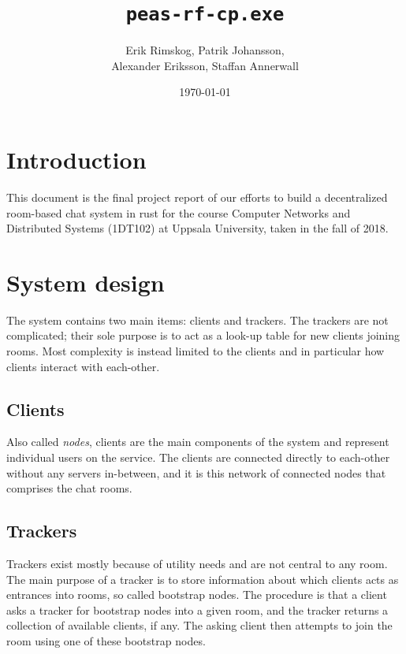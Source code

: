 \documentclass[12pt, a4paper]{article}
\title{\texttt{peas-rf-cp.exe}}
\author{Erik Rimskog, Patrik Johansson,\\Alexander Eriksson, Staffan Annerwall}
\date{\today}
\begin{document}
\maketitle
\thispagestyle{empty}
\newpage
\tableofcontents

\newpage

\section{Introduction}
\label{sec:intro}

This document is the final project report of our efforts to build a decentralized room-based chat system in rust for the course Computer Networks and Distributed Systems (1DT102) at Uppsala University, taken in the fall of 2018.

\section{System design}
\label{sec:design}

The system contains two main items: clients and trackers. The trackers are not complicated; their sole purpose is to act as a look-up table for new clients joining rooms. Most complexity is instead limited to the clients and in particular how clients interact with each-other.

\subsection{Clients}
\label{sec:info-client}

Also called \emph{nodes}, clients are the main components of the system and represent individual users on the service. The clients are connected directly to each-other without any servers in-between, and it is this network of connected nodes that comprises the chat rooms.

\subsection{Trackers}
\label{sec:info-tracker}

Trackers exist mostly because of utility needs and are not central to any room. The main purpose of a tracker is to store information about which clients acts as entrances into rooms, so called bootstrap nodes. The procedure is that a client asks a tracker for bootstrap nodes into a given room, and the tracker returns a collection of available clients, if any. The asking client then attempts to join the room using one of these bootstrap nodes.
\end{document}
